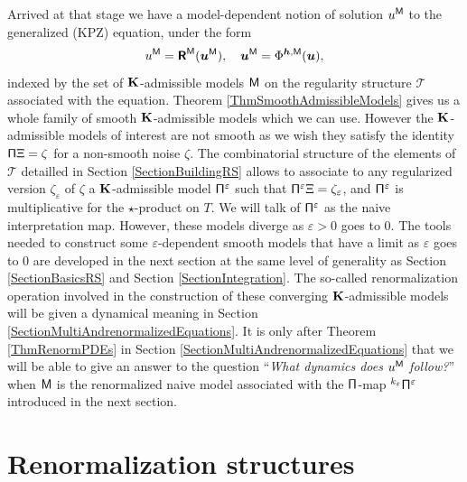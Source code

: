 \documentclass[10pt, reqno]{amsart}
\numberwithin{subsection}{section}
\numberwithin{subsubsection}{subsection}
\numberwithin{equation}{section} %
\theoremstyle{mystyle}
\theoremstyle{mystyle2}
\theoremstyle{mystyle3}
\newcommand{\bsh}{\boldsymbol{h}}
\newcommand{\bsu}{\boldsymbol{u}}
\renewcommand{\epsilon}{\varepsilon}
\begin{document}
Arrived at that stage we have a model-dependent notion of solution $u^{\sf M}$ to 
the generalized (KPZ) equation, under the form
$$
u^{\sf M} = \textsf{\textbf{R}}^{\sf M}(\bsu^{\sf M}),\quad \bsu^{\sf M} = \Phi^{\bsh,\sf M}(\bsu),
$$
indexed by the set of $\bf K$-admissible models $\sf M$ on the regularity structure $\mathscr{T}$ associated with the equation. Theorem \ref{ThmSmoothAdmissibleModels} gives us a whole family of smooth $\bf K$-admissible models which we can use. However the $\bf K$-admissible models of interest are not smooth as we wish they satisfy the identity ${\sf \Pi}\Xi=\zeta$ for a non-smooth noise $\zeta$. The combinatorial structure of the elements of $\mathscr{T}$ detailled in Section \ref{SectionBuildingRS} allows to associate to any regularized version $\zeta_\epsilon$ of $\zeta$ a $\bf K$-admissible model ${\sf \Pi}^\epsilon$ such that ${\sf \Pi}^\epsilon\Xi=\zeta_\epsilon$, and ${\sf \Pi}^\epsilon$ is multiplicative for the $\star$-product on $T$. We will talk of ${\sf \Pi}^\epsilon$ as the naive interpretation map. However, these models diverge as $\epsilon>0$ goes to $0$. The tools needed to construct some $\epsilon$-dependent smooth models that have a limit as $\epsilon$ goes to $0$ are developed in the next section at the same level of generality as Section \ref{SectionBasicsRS} and Section \ref{SectionIntegration}. The so-called renormalization operation involved in the construction of these converging $\bf K$-admissible models will be given a dynamical meaning in Section \ref{SectionMultiAndrenormalizedEquations}. It is only after Theorem \ref{ThmRenormPDEs} in Section \ref{SectionMultiAndrenormalizedEquations} that we will be able to give an answer to the question ``{\it What dynamics does $u^{\sf M}$ follow?}'' when ${\sf M}$ is the renormalized naive model associated with the $\sf \Pi$-map ${^{k_\epsilon}}{\sf \Pi}^\epsilon$ introduced in the next section.



\bigskip



\section{Renormalization structures}
\label{SectionConcreteRenormStructure}
\end{document}
